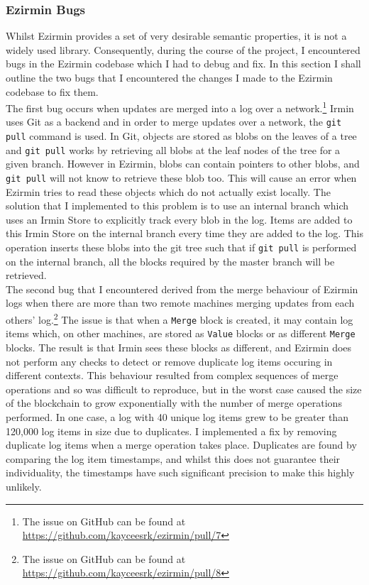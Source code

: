 \documentclass[12pt,a4paper,twoside,openright]{report}
\begin{document}
	\subsubsection*{Ezirmin Bugs}
	Whilst Ezirmin provides a set of very desirable semantic properties, it is not a widely used library. 
	Consequently, during the course of the project, I encountered bugs in the Ezirmin codebase which I had to debug and fix.
	In this section I shall outline the two bugs that I encountered the changes I made to the Ezirmin codebase to fix them.\\
	
	The first bug occurs when updates are merged into a log over a network.\footnote{The issue on GitHub can be found at \href{https://github.com/kayceesrk/ezirmin/pull/7}{https://github.com/kayceesrk/ezirmin/pull/7}}
	Irmin uses Git as a backend and in order to merge updates over a network, the \texttt{git pull} command is used.
	In Git, objects are stored as blobs on the leaves of a tree and \texttt{git pull} works by retrieving all blobs at the leaf nodes of the tree for a given branch.
	However in Ezirmin, blobs can contain pointers to other blobs, and \texttt{git pull} will not know to retrieve these blob too.
	This will cause an error when Ezirmin tries to read these objects which do not actually exist locally. 
	The solution that I implemented to this problem is to use an internal branch which uses an Irmin Store to explicitly track every blob in the log.
	Items are added to this Irmin Store on the internal branch every time they are added to the log.
	This operation inserts these blobs into the git tree such that if \texttt{git pull} is performed on the internal branch, all the blocks required by the master branch will be retrieved.\\

	The second bug that I encountered derived from the merge behaviour of Ezirmin logs when there are more than two remote machines merging updates from each others' log.\footnote{The issue on GitHub can be found at \href{https://github.com/kayceesrk/ezirmin/pull/8}{https://github.com/kayceesrk/ezirmin/pull/8}}
	The issue is that when a \texttt{Merge} block is created, it may contain log items which, on other machines, are stored as \texttt{Value} blocks or as different \texttt{Merge} blocks.
	The result is that Irmin sees these blocks as different, and Ezirmin does not perform any checks to detect or remove duplicate log items occuring in different contexts.
	This behaviour resulted from complex sequences of merge operations and so was difficult to reproduce, but in the worst case caused the size of the blockchain to grow exponentially with the number of merge operations performed.
	In one case, a log with 40 unique log items grew to be greater than 120,000 log items in size due to duplicates.
	I implemented a fix by removing duplicate log items when a merge operation takes place. 
	Duplicates are found by comparing the log item timestamps, and whilst this does not guarantee their individuality, the timestamps have such significant precision to make this highly unlikely.
\end{document}
